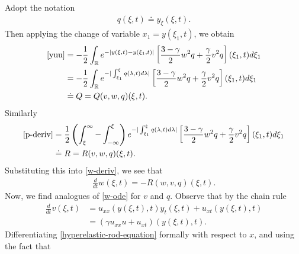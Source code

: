\documentclass[12pt,reqno]{amsart}
\numberwithin{equation}{section}  %
\numberwithin{figure}{section}
\newcommand{\rr}{\mathbb{R}}
\begin{document}
%
%
Adopt the notation 
%
%
\begin{equation*}
\begin{split}
q(\xi, t) \doteq y_{\xi}(\xi, t).
\end{split}
\end{equation*}
%
%
Then applying the change of variable $x_{1} = y(\xi_{1}, t)$, we obtain
%
%
\begin{equation*}
\begin{split}
\eqref{yuu} & = -\frac{1}{2} \int_{\rr} e^{-| y(\xi, t) - y(\xi_{1}, t) |} \left [
\frac{3 -\gamma}{2} w^{2}q + \frac{\gamma}{2} v^{2} q  \right ](\xi_{1}, t) d \xi_{1}
\\
& = -\frac{1}{2} \int_{\rr} e^{-| \int_{\xi_{1}}^{\xi} q(\lambda, t) d \lambda |} \left [
\frac{3 -\gamma}{2} w^{2}q + \frac{\gamma}{2} v^{2} q  \right ](\xi_{1}, t) d \xi_{1}
\\
& \doteq Q = Q(v, w, q)(\xi, t).
\end{split}
\end{equation*}
%
%
Similarly
%
%
\begin{equation}
\label{R-def}
\begin{split}
\eqref{p-deriv} & = \frac{1}{2} \left ( \int_{\xi}^{\infty} -
\int_{-\infty}^{\xi} \right ) e^{-| \int_{\xi_{1}}^{\xi} q(\lambda, t) d \lambda 
|} \left [ \frac{3 - \gamma}{2} w^{2} q + \frac{\gamma}{2} v^{2} q \right ] (\xi_{1}, t) d \xi_{1}
\\
& \doteq R = R(v, w, q)(\xi, t). 
\end{split}
\end{equation}
%
Substituting this into \eqref{w-deriv}, we see that
%
%
\begin{equation}
\label{w-ode}
\begin{split}
\frac{d}{dt}w(\xi, t) = -R(w, v, q)(\xi, t).
\end{split}
\end{equation}
%
%
Now, we find analogues of \eqref{w-ode} for $v$ and $q$. Observe that by the
chain rule 
%
\begin{equation}
\label{lkk}
\begin{split}
\frac{d}{dt}v(\xi, t)
&  = u_{xx}(y(\xi, t), t) y_{t}(\xi, t) + u_{xt}(y(\xi, t), t)
\\
& =  (\gamma u_{xx}u + u_{xt})(y(\xi, t), t).
\end{split}
\end{equation}
%
Differentiating \eqref{hyperelastic-rod-equation} formally with respect to $x$,
and using the fact that
%
%
\end{document}
